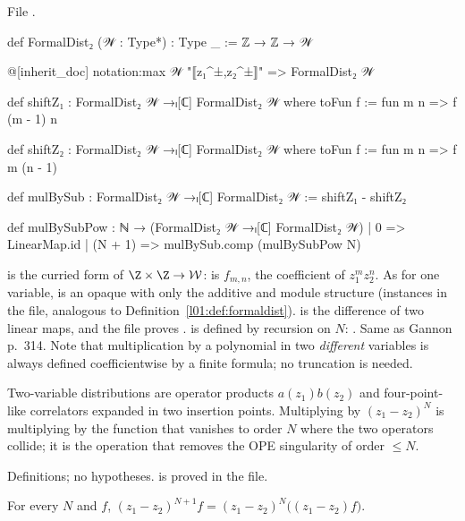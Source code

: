 \noindent File .
\begin{leancode}
def FormalDist₂ (𝒲 : Type*) : Type _ := ℤ → ℤ → 𝒲

@[inherit_doc] notation:max 𝒲 "⟦z₁^±,z₂^±⟧" => FormalDist₂ 𝒲

def shiftZ₁ : FormalDist₂ 𝒲 →ₗ[ℂ] FormalDist₂ 𝒲 where
  toFun f := fun m n => f (m - 1) n

def shiftZ₂ : FormalDist₂ 𝒲 →ₗ[ℂ] FormalDist₂ 𝒲 where
  toFun f := fun m n => f m (n - 1)

def mulBySub : FormalDist₂ 𝒲 →ₗ[ℂ] FormalDist₂ 𝒲 := shiftZ₁ - shiftZ₂

def mulBySubPow : ℕ → (FormalDist₂ 𝒲 →ₗ[ℂ] FormalDist₂ 𝒲)
  | 0 => LinearMap.id
  | (N + 1) => mulBySub.comp (mulBySubPow N)
\end{leancode}

\begin{dictionary}
 is the curried form of $\Z\times\Z\to\loneW$:  is $f_{m,n}$, the coefficient of
$z_1^mz_2^n$. As for one variable,  is an opaque  with only the additive and module
structure (instances in the file, analogous to Definition~\ref{l01:def:formaldist}). 
is the difference of two linear maps, and the file proves
.  is defined by
recursion on $N$: . Same as Gannon p.~314. Note
that multiplication by a polynomial in two \emph{different} variables is always defined coefficientwise
by a finite formula; no truncation is needed.
\end{dictionary}

\begin{physics}
Two-variable distributions are operator products $a(z_1)b(z_2)$ and four-point-like correlators
expanded in two insertion points. Multiplying by $(z_1-z_2)^N$ is multiplying by the function that
vanishes to order $N$ where the two operators collide; it is the operation that removes the OPE
singularity of order $\le N$.
\end{physics}

\begin{status}
Definitions; no hypotheses.  is proved in the file.
\end{status}

\begin{lemma}\label{l01:lem:subpowcomm}
For every $N$ and $f$, $(z_1-z_2)^{N+1}f = (z_1-z_2)^N\big((z_1-z_2)f\big)$.
\end{lemma}

